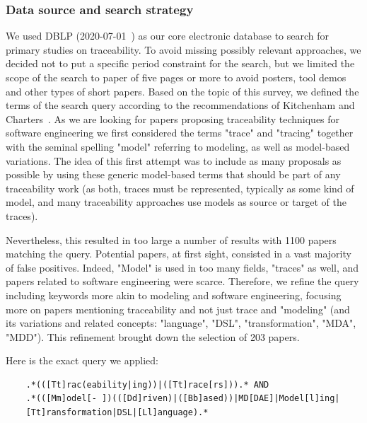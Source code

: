 \subsubsection{Data source and search strategy}
We used DBLP (2020-07-01~\cite{dblp}) as our core electronic database to search for primary studies on traceability.
To avoid missing possibly relevant approaches, we decided not to put a specific period constraint for the search, but we limited the scope of the search to paper of five pages or more to avoid posters, tool demos and other types of short papers.
Based on the topic of this survey, we defined the terms of the search query according to the recommendations of Kitchenham and Charters~\cite{kitchenham2008}. 
As we are looking for papers proposing traceability techniques for software engineering we first considered the terms "trace" and "tracing" together with the seminal spelling "model" referring to modeling, as well as model-based variations. The idea of this first attempt was to include as many proposals as possible by using these generic model-based terms that should be part of any traceability work (as both, traces must be represented, typically as some kind of model, and many traceability approaches use models as source or target of the traces).

Nevertheless, this resulted in too large a number of results with 1100 papers matching the query. Potential papers, at first sight, consisted in a vast majority of false positives. Indeed, "Model" is used in too many fields, "traces" as well, and papers related to software engineering were scarce.
Therefore, we refine the query including keywords more akin to modeling and software engineering, focusing more on papers mentioning traceability and not just trace and "modeling" (and its variations and related concepts: "language", "DSL", "transformation", "MDA", "MDD"). This refinement brought down the selection of 203 papers. 

Here is the exact query we applied:
\begin{verbatim}
	.*(([Tt]rac(eability|ing))|([Tt]race[rs])).* AND
	.*(([Mm]odel[- ])(([Dd]riven)|([Bb]ased))|MD[DAE]|Model[l]ing|
	[Tt]ransformation|DSL|[Ll]anguage).*
\end{verbatim}



